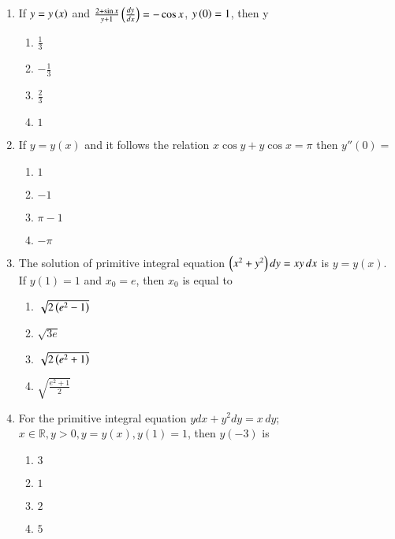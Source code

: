 \documentclass[journal,12pt,twocolumn]{IEEEtran}
\theoremstyle{remark}
\begin{document}
\begin{enumerate}
\item If $y = y\left(x\right)$ and $\frac{2 + \sin x}{y + 1}\left(\frac{dy}{dx}\right) = -\cos x$, $y\left(0\right) = 1$, then y \hfill {}

\begin{multicols}{2}
\begin{enumerate}
    \item $\frac{1}{3}$
    \item $-\frac{1}{3}$
    \item $\frac{2}{3}$
    \item $1$
\end{enumerate}
\end{multicols}

\item If $y = y(x)$ and it follows the relation $x \cos y + y \cos x = \pi$ then $y''(0) =$ \hfill {}

\begin{multicols}{2}
\begin{enumerate}
    \item $1$
    \item $-1$
    \item $\pi - 1$
    \item $-\pi$
\end{enumerate}  
\end{multicols}

\item The solution of primitive integral equation $\left(x^2 + y^2\right)dy = xy \, dx$ is $y = y(x)$. If $y(1) = 1$ and $x_0 = e$, then $x_0$ is equal to \hfill {}

\begin{multicols}{2}
\begin{enumerate}
    \item $\sqrt{2\left(e^2 - 1\right)}$
    \item $\sqrt{3e}$ 
    \item $\sqrt{2\left(e^2 + 1\right)}$
    \item $\sqrt{\frac{e^2 + 1}{2}}$
\end{enumerate}
\end{multicols}

\item For the primitive integral equation $y dx + y^2 dy = x \, dy$; $x \in \mathbb{R}, y > 0, y = y(x), y(1) = 1$, then $y(-3)$ is \hfill {}

\begin{multicols}{2}
\begin{enumerate}
    \item $3$
    \item $1$ 
    \item $2$
    \item $5$
\end{enumerate}
\end{multicols}


\end{enumerate}
\end{document}

